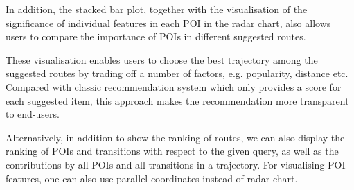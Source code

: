 \documentclass[sigconf]{acmart}
\begin{document}
In addition, the stacked bar plot,
together with the visualisation of the significance of individual features in each POI in the radar chart,
also allows users to compare the importance of POIs in different suggested routes.

These visualisation enables users to choose the best trajectory among the suggested routes by trading off a number of factors, e.g. popularity, distance etc.
Compared with classic recommendation system which only provides a score for each suggested item, 
this approach makes the recommendation more transparent to end-users.

Alternatively, in addition to show the ranking of routes, 
we can also display the ranking of POIs and transitions with respect to the given query, 
as well as the contributions by all POIs and all transitions in a trajectory.
For visualising POI features, one can also use parallel coordinates instead of radar chart.



\end{document}
